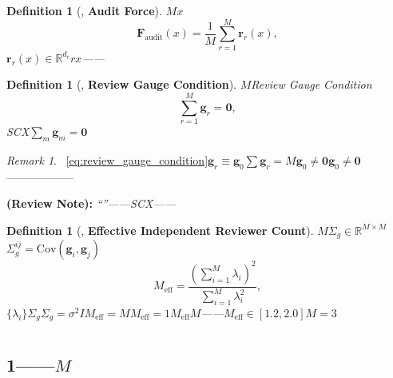 \documentclass[12pt,a4paper]{article}
\newtheorem{definition}[theorem]{Definition}
\theoremstyle{remark}
\newtheorem{remark}[theorem]{Remark}
\newcommand{\R}{\mathbb{R}}
\newcommand{\Cov}{\mathrm{Cov}}
\newcommand{\sumgd}{\sum_m \mathbf{g}_m = \mathbf{0}}
\newcommand{\auditForce}{\mathbf{F}_{\text{audit}}}
\newcommand{\reviewVec}{\mathbf{r}}
\newcommand{\gaugeVec}{\mathbf{g}}
\newcommand{\reviewnote}[1]{%
    \medskip\noindent
    \textbf{ (Review Note):} \textit{#1}%
}
\begin{document}
\begin{definition}[, \textbf{Audit Force}]
\label{def:audit_force}
$M$$x$\textbf{}
\begin{equation}
    \auditForce(x) = \frac{1}{M} \sum_{r=1}^{M} \reviewVec_r(x),
    \label{eq:audit_force}
\end{equation}
$\reviewVec_r(x) \in \R^{d_r}$$r$$x$——
\end{definition}

\begin{definition}[, \textbf{Review Gauge Condition}]
\label{def:review_gauge_condition}
$M$\textbf{}Review Gauge Condition
\begin{equation}
    \sum_{r=1}^{M} \gaugeVec_r = \mathbf{0},
    \label{eq:review_gauge_condition}
\end{equation}
SCX$\sumgd$
\end{definition}

\begin{remark}
~\eqref{eq:review_gauge_condition}\textbf{}$\gaugeVec_r \equiv \gaugeVec_0$$\sum \gaugeVec_r = M\gaugeVec_0 \neq \mathbf{0}$$\gaugeVec_0 \neq \mathbf{0}$——————
\end{remark}

\reviewnote{``''——SCX\textbf{}——}

\begin{definition}[, \textbf{Effective Independent Reviewer Count}]
\label{def:effective_M}
$M$$\Sigma_g \in \R^{M \times M}$$\Sigma_g^{ij} = \Cov(\gaugeVec_i, \gaugeVec_j)$\textbf{}
\begin{equation}
    M_{\text{eff}} = \frac{(\sum_{i=1}^{M} \lambda_i)^2}{\sum_{i=1}^{M} \lambda_i^2},
    \label{eq:effective_M}
\end{equation}
$\{\lambda_i\}$$\Sigma_g$$\Sigma_g = \sigma^2 I$$M_{\text{eff}} = M$$M_{\text{eff}} = 1$$M_{\text{eff}}$$M$——$M_{\text{eff}} \in [1.2, 2.0]$$M=3$
\end{definition}

\section{}
\label{sec:theorems}

\subsection{1——$M$}
\end{document}

